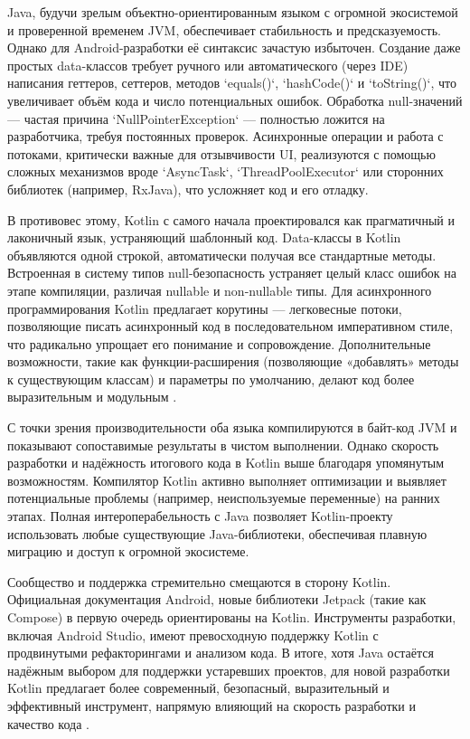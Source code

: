 Java, будучи зрелым объектно-ориентированным языком с огромной экосистемой и проверенной временем JVM, обеспечивает стабильность и предсказуемость. Однако для Android-разработки её синтаксис зачастую избыточен. Создание даже простых data-классов требует ручного или автоматического (через IDE) написания геттеров, сеттеров, методов `equals()`, `hashCode()` и `toString()`, что увеличивает объём кода и число потенциальных ошибок. Обработка null-значений — частая причина `NullPointerException` — полностью ложится на разработчика, требуя постоянных проверок. Асинхронные операции и работа с потоками, критически важные для отзывчивости UI, реализуются с помощью сложных механизмов вроде `AsyncTask`, `ThreadPoolExecutor` или сторонних библиотек (например, RxJava), что усложняет код и его отладку.

В противовес этому, Kotlin с самого начала проектировался как прагматичный и лаконичный язык, устраняющий шаблонный код. Data-классы в Kotlin объявляются одной строкой, автоматически получая все стандартные методы. Встроенная в систему типов null-безопасность устраняет целый класс ошибок на этапе компиляции, различая nullable и non-nullable типы. Для асинхронного программирования Kotlin предлагает корутины — легковесные потоки, позволяющие писать асинхронный код в последовательном императивном стиле, что радикально упрощает его понимание и сопровождение. Дополнительные возможности, такие как функции-расширения (позволяющие «добавлять» методы к существующим классам) и параметры по умолчанию, делают код более выразительным и модульным \cite{refc}.

С точки зрения производительности оба языка компилируются в байт-код JVM и показывают сопоставимые результаты в чистом выполнении. Однако скорость разработки и надёжность итогового кода в Kotlin выше благодаря упомянутым возможностям. Компилятор Kotlin активно выполняет оптимизации и выявляет потенциальные проблемы (например, неиспользуемые переменные) на ранних этапах. Полная интероперабельность с Java позволяет Kotlin-проекту использовать любые существующие Java-библиотеки, обеспечивая плавную миграцию и доступ к огромной экосистеме.

Сообщество и поддержка стремительно смещаются в сторону Kotlin. Официальная документация Android, новые библиотеки Jetpack (такие как Compose) в первую очередь ориентированы на Kotlin. Инструменты разработки, включая Android Studio, имеют превосходную поддержку Kotlin с продвинутыми рефакторингами и анализом кода. В итоге, хотя Java остаётся надёжным выбором для поддержки устаревших проектов, для новой разработки Kotlin предлагает более современный, безопасный, выразительный и эффективный инструмент, напрямую влияющий на скорость разработки и качество кода \cite{refc,refd}.

